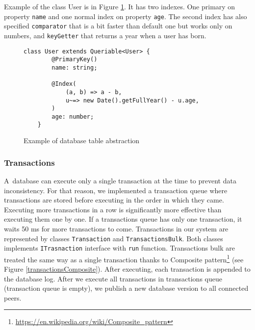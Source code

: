 Example of the class User is in Figure \ref{classExample}. It has two indexes. One primary on property \texttt{name} and one normal index on property \texttt{age}. The second index has also specified \texttt{comparator} that is a bit faster than default one but works only on numbers, and \texttt{keyGetter} that returns a year when a user has born. 

\begin{figure}[h]
    \centering
    \begin{lstlisting}[style=ES6]
    class User extends Queriable<User> {
        @PrimaryKey()
        name: string;

        @Index(
            (a, b) => a - b,
            u~=> new Date().getFullYear() - u.age,
        )
        age: number;
    }
    \end{lstlisting}
    \caption{Example of database table abstraction }
    \label{classExample}
\end{figure}



\subsubsection{Transactions}
A~database can execute only a single transaction at the time to prevent data inconsistency. For that reason, we implemented a transaction queue where transactions are stored before executing in the order in which they came. Executing more transactions in a row is significantly more effective than executing them one by one. If a transactions queue has only one transaction, it waits 50 ms for more transactions to come. Transactions in our system are represented by classes \texttt{Transaction} and \texttt{TransactionsBulk}. Both classes implements \texttt{ITrasnaction} interface with \texttt{run} function. Transactions bulk are treated the same way as a single transaction thanks to Composite pattern\footnote{\url{https://en.wikipedia.org/wiki/Composite_pattern}} (see Figure \ref{transactionsComposite}). After executing, each transaction is appended to the database log. After we execute all transactions in transactions queue (transaction queue is empty), we publish a new database version to all connected peers.

